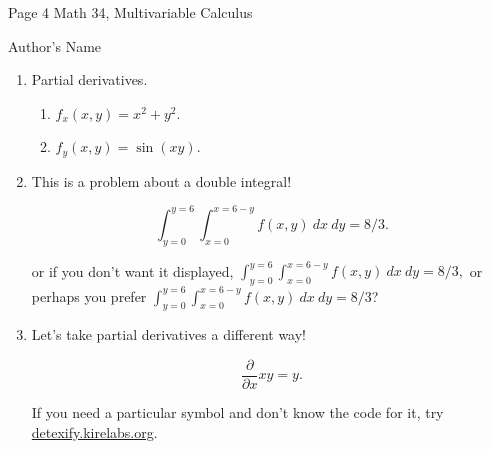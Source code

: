 \documentclass{article}
\begin{document}
\large %


{\Large Page 4 %
\hfill  Math 34, Multivariable Calculus}

\begin{center}
{\Large Author's Name} %
\end{center}
\vspace{0.05in}


\begin{enumerate}

\item Partial derivatives.

\begin{enumerate}
\item $f_x(x,y) = x^2+y^2$.
\item $f_y(x,y) = \sin(xy)$.
\end{enumerate}




\item This is a problem about a double integral!

$$\int_{y=0}^{y=6} \int_{x=0}^{x=6-y} f(x,y) \ dx \ dy = 8/3.$$

or if you don't want it displayed, $\int_{y=0}^{y=6} \int_{x=0}^{x=6-y} f(x,y) \ dx \ dy = 8/3,$ or perhaps you prefer $\displaystyle \int_{y=0}^{y=6} \int_{x=0}^{x=6-y} f(x,y) \ dx \ dy = 8/3$?

\item Let's take partial derivatives a different way! 

$$\frac{\partial}{\partial x} xy = y.$$

If you need a particular symbol and don't know the code for it, try \url{detexify.kirelabs.org}.

\end{enumerate}

\end{document}
